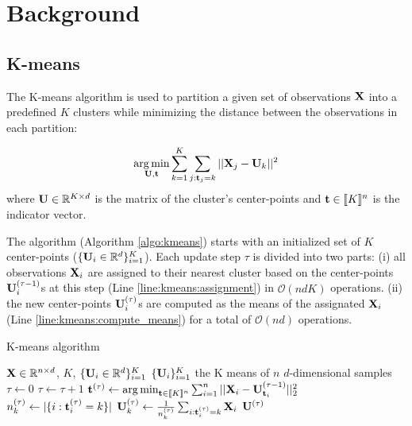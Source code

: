 \section{Background}
\label{sec:background}
\subsection{K-means}
\label{sec:kmeans}
The K-means algorithm is used to partition a given set of observations ${\mathbf{X}}$ into a predefined $K$ clusters while minimizing the distance between the observations in each partition:

\begin{equation}
\label{eq:kmean_problem}
    \operatorname*{arg\,min}_{{\mathbf{U}}, {\mathbf{t}}} \sum_{k=1}^{K} \sum_{j: {\mathbf{t}}_j = k} ||{\mathbf{X}}_j -{\mathbf{U}}_k||^2 \\
\end{equation}
where ${\mathbf{U}} \in \mathbb{R}^{K \times d}$ is the matrix of the cluster's center-points and ${\mathbf{t}} \in  [\![K]\!]^n$ is the indicator vector.

The algorithm (Algorithm \ref{algo:kmeans}) starts with an initialized set of $K$ center-points ($\{{\mathbf{U}}_i \in \mathbb{R}^d\}_{i=1}^{K}$). Each update step $\tau$ is divided into two parts: (i) all observations ${\mathbf{X}}_i$ are assigned to their nearest cluster based on the center-points ${\mathbf{U}}_i^{(\tau-1)}$s at this step (Line \ref{line:kmeans:assignment}) in $\mathcal{O}(ndK)$ operations. (ii) the new center-points ${\mathbf{U}}_i^{(\tau)}$s are computed as the means of the assignated ${\mathbf{X}}_i$ (Line \ref{line:kmeans:compute_means}) for a total of $\mathcal{O}(nd)$ operations.

\begin{algorithm}
\caption{K-means algorithm}
\label{algo:kmeans}
\begin{algorithmic}[1]


\REQUIRE ${\mathbf{X}} \in \mathbb{R}^{n \times d}$, $K$, $\{{\mathbf{U}}_i \in \mathbb{R}^d\}_{i=1}^{K}$
\ENSURE $\{{\mathbf{U}}_i\}_{i=1}^{K}$ the K means of $n$ $d$-dimensional samples
\STATE $\tau \leftarrow 0$
\REPEAT
\STATE $\tau \leftarrow \tau + 1$
\STATE ${\mathbf{t}}^{(\tau)} \leftarrow \operatorname*{arg\,min}_{{\mathbf{t}} \in [\![K]\!]^n} \sum_{i=1}^{n} {||{\mathbf{X}}_i - {\mathbf{U}}^{(\tau-1)}_{{\mathbf{t}}_i}||_2^2}$
\label{line:kmeans:assignment}
\STATE $n_k^{(\tau)} \leftarrow |\{i: {\mathbf{t}}^{(\tau)}_i=k\}|$
\label{line:kmeans:count}
\STATE ${\mathbf{U}}^{(\tau)}_k \leftarrow \frac{1}{n_k^{(\tau)}} \sum_{i: {\mathbf{t}}^{(\tau)}_i = k} {{\mathbf{X}}_i}$
\label{line:kmeans:compute_means}
\ENDFOR
{}
\RETURN ${\mathbf{U}}^{(\tau)}$
\end{algorithmic}
\end{algorithm}


